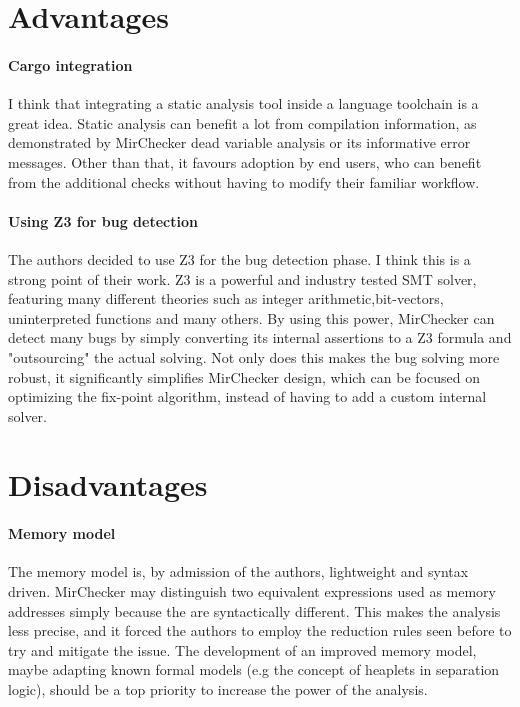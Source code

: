 \documentclass{article}
\begin{document}
 \section*{Advantages}

 \paragraph*{Cargo integration} I think that integrating a static analysis tool inside a language toolchain is a great idea. 
 Static analysis can benefit a lot from compilation information, as demonstrated by MirChecker dead variable analysis or its 
 informative error messages. Other than that, it favours adoption by end users, who can benefit from the additional checks without 
 having to modify their familiar workflow.


 \paragraph*{Using Z3 for bug detection} The authors decided to use Z3 for the bug detection phase. I think this is a 
 strong point of their work. Z3 is a powerful and industry tested SMT solver, featuring many different theories such as integer 
 arithmetic,bit-vectors, uninterpreted functions and many others. By using this power, MirChecker can detect many bugs by simply 
 converting its internal assertions to a Z3 formula and "outsourcing" the actual solving. Not only does this makes the bug solving more robust, 
 it significantly simplifies MirChecker design, which can be focused on optimizing the fix-point algorithm, instead of having to add a custom internal solver.

\section*{Disadvantages}

\paragraph*{Memory model}
The memory model is, by admission of the authors, lightweight and syntax driven. MirChecker may distinguish 
two  equivalent expressions used as memory addresses simply because the are syntactically different. This makes the analysis 
less precise, and it forced the authors to employ the reduction rules seen before to try and mitigate the issue. The development of an improved
memory model, maybe adapting known formal models  (e.g the concept of heaplets in separation logic), should be a top priority to  
increase the power of the analysis.
\end{document}
